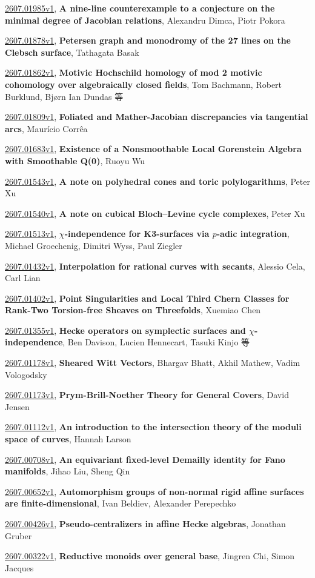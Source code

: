 \documentclass[9pt, a4paper]{article}
\theoremstyle{plain}
\theoremstyle{definition}
\theoremstyle{remark}
\newcommand{\arxiv}[3]{\href{https://arxiv.org/abs/#1}{#1}, \textbf{\textcolor{arxivblue}{#2}}, #3}
\begin{document}
\arxiv{2607.01985v1}{A nine-line counterexample to a conjecture on the minimal degree of Jacobian relations}{Alexandru Dimca, Piotr Pokora}

\arxiv{2607.01878v1}{Petersen graph and monodromy of the 27 lines on the Clebsch surface}{Tathagata Basak}

\arxiv{2607.01862v1}{Motivic Hochschild homology of mod 2 motivic cohomology over algebraically closed fields}{Tom Bachmann, Robert Burklund, Bjørn Ian Dundas 等}

\arxiv{2607.01809v1}{Foliated and Mather-Jacobian discrepancies via tangential arcs}{Maurício Corrêa}

\arxiv{2607.01683v1}{Existence of a Nonsmoothable Local Gorenstein Algebra with Smoothable Q(0)}{Ruoyu Wu}

\arxiv{2607.01543v1}{A note on polyhedral cones and toric polylogarithms}{Peter Xu}

\arxiv{2607.01540v1}{A note on cubical Bloch--Levine cycle complexes}{Peter Xu}

\arxiv{2607.01513v1}{$χ$-independence for K3-surfaces via $p$-adic integration}{Michael Groechenig, Dimitri Wyss, Paul Ziegler}

\arxiv{2607.01432v1}{Interpolation for rational curves with secants}{Alessio Cela, Carl Lian}

\arxiv{2607.01402v1}{Point Singularities and Local Third Chern Classes for Rank-Two Torsion-free Sheaves on Threefolds}{Xuemiao Chen}

\arxiv{2607.01355v1}{Hecke operators on symplectic surfaces and $χ$-independence}{Ben Davison, Lucien Hennecart, Tasuki Kinjo 等}

\arxiv{2607.01178v1}{Sheared Witt Vectors}{Bhargav Bhatt, Akhil Mathew, Vadim Vologodsky}

\arxiv{2607.01173v1}{Prym-Brill-Noether Theory for General Covers}{David Jensen}

\arxiv{2607.01112v1}{An introduction to the intersection theory of the moduli space of curves}{Hannah Larson}

\arxiv{2607.00708v1}{An equivariant fixed-level Demailly identity for Fano manifolds}{Jihao Liu, Sheng Qin}

\arxiv{2607.00652v1}{Automorphism groups of non-normal rigid affine surfaces are finite-dimensional}{Ivan Beldiev, Alexander Perepechko}

\arxiv{2607.00426v1}{Pseudo-centralizers in affine Hecke algebras}{Jonathan Gruber}

\arxiv{2607.00322v1}{Reductive monoids over general base}{Jingren Chi, Simon Jacques}
\end{document}
